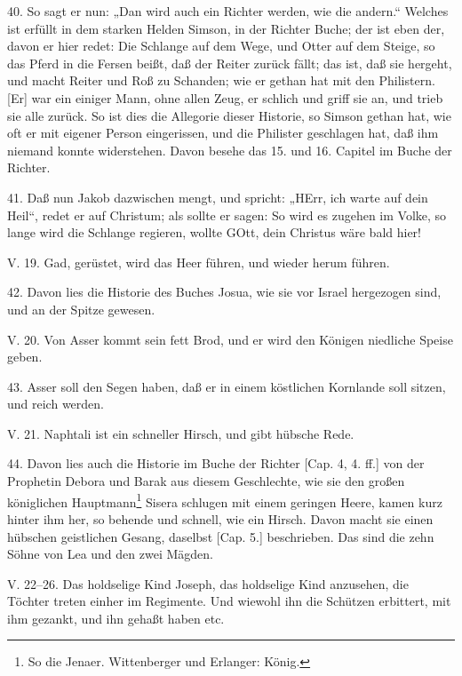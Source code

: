 40. So sagt er nun: „Dan wird auch ein Richter werden, wie die andern.“ Welches ist erfüllt in dem starken Helden Simson, in der Richter Buche; der ist eben der, davon er hier redet: Die Schlange auf dem Wege, und Otter auf dem Steige, so das Pferd in die Fersen beißt, daß der Reiter zurück fällt; das ist, daß sie hergeht, und macht Reiter und Roß zu Schanden; wie er gethan hat mit den Philistern. [Er] war ein einiger Mann, ohne allen Zeug, er schlich und griff sie an, und trieb sie alle zurück. So ist dies die Allegorie dieser Historie, so Simson gethan hat, wie oft er mit eigener Person eingerissen, und die Philister geschlagen hat, daß ihm niemand konnte widerstehen. Davon besehe das 15. und 16. Capitel im Buche der Richter.

41. Daß nun Jakob dazwischen mengt, und spricht: „HErr, ich warte auf dein Heil“, redet er auf Christum; als sollte er sagen: So wird es zugehen im Volke, so lange wird die Schlange regieren, wollte GOtt, dein Christus wäre bald hier!

\begin{schriftzitat}
V. 19. Gad, gerüstet, wird das Heer führen, und wieder herum führen.
\end{schriftzitat}

42. Davon lies die Historie des Buches Josua, wie sie vor Israel hergezogen sind, und an der Spitze gewesen.

\begin{schriftzitat}
V. 20. Von Asser kommt sein fett Brod, und er wird den Königen niedliche Speise geben.
\end{schriftzitat}

43. Asser soll den Segen haben, daß er in einem köstlichen Kornlande soll sitzen, und reich werden.

\begin{schriftzitat}
V. 21. Naphtali ist ein schneller Hirsch, und gibt hübsche Rede.
\end{schriftzitat}

44. Davon lies auch die Historie im Buche der Richter [Cap. 4, 4. ff.] von der Prophetin Debora und Barak aus diesem Geschlechte, wie sie den großen königlichen Hauptmann\footnote{So die Jenaer. Wittenberger und Erlanger: König.} Sisera schlugen mit einem geringen Heere, kamen kurz hinter ihm her, so behende und schnell, wie ein Hirsch. Davon macht sie einen hübschen geistlichen Gesang, daselbst [Cap. 5.] beschrieben. Das sind die zehn Söhne von Lea und den zwei Mägden.

\begin{schriftzitat}
V. 22–26. Das holdselige Kind Joseph, das holdselige Kind anzusehen, die Töchter treten einher im Regimente. Und wiewohl ihn die Schützen erbittert, mit ihm gezankt, und ihn gehaßt haben etc.
\end{schriftzitat}

